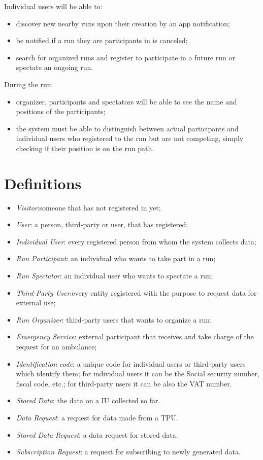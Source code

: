 Individual users will be able to: 
\begin{itemize}
\item 
discover new nearby runs upon their creation by an app notification; 
\item 
be notified if a run they are participants in is canceled; 
\item 
search for organized runs and register to participate in a future run or spectate an ongoing run.
\end{itemize}
During the run: 
\begin{itemize}
\item 
organizer, participants and spectators will be able to see the name and positions of the participants; 
\item 
the system must be able to distinguish between actual participants and individual users who registered to the run but are not competing, simply checking if their position is on the run path. 
\end{itemize}

\section{Definitions}
\begin{itemize}
\item \textit{Visitor}:someone that has not registered in yet;
\item \textit{User}: a person, third-party or user, that has registered;
\item \textit{Individual User}: every registered person from whom the system collects data; 
\item \textit{Run Participant}: an individual who wants to take part in a run;
\item \textit{Run Spectator}: an individual user who wants to spectate a run;
\item \textit{Third-Party User}:every entity registered with the purpose to request data for external use;
\item \textit{Run Organizer}: third-party users that wants to organize a run;
\item \textit{Emergency Service}: external participant that receives and take charge of the request for an ambulance;
\item \textit{Identification code}: a unique code for individual users or third-party users which identify them; for individual users it can be the Social security number, fiscal code, etc.; for third-party users it can be also the VAT number.
\item \textit{Stored Data}: the data on a IU collected so far.
\item \textit{Data Request}: a request for data made from a TPU.
\item \textit{Stored Data Request}: a data request for stored data.
\item \textit{Subscription Request}: a request for subscribing to newly generated data.
\end{itemize}
